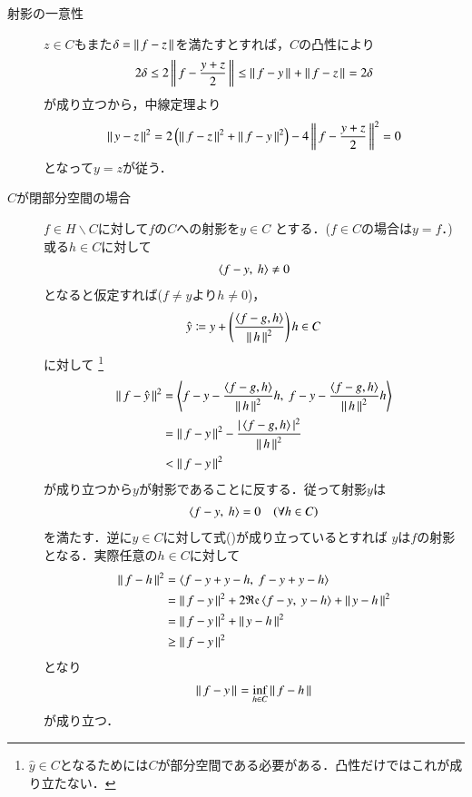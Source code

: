 \begin{prf}
\begin{description}
	\item[射影の一意性]
		$z \in C$もまた$\delta = \left\|\, f - z\, \right\|_{}$を満たすとすれば，$C$の凸性により
		\begin{align}
			2 \delta \leq 2\left\|\, f - \frac{y + z}{2}\, \right\|_{} \leq \left\|\, f - y\, \right\|_{} + \left\|\, f - z\, \right\|_{} = 2\delta
		\end{align}
		が成り立つから，中線定理より
		\begin{align}
			\left\|\, y - z\, \right\|_{}^2 = 2\left( \left\|\, f - z\, \right\|_{}^2 + \left\|\, f - y\, \right\|_{}^2 \right) - 4\left\|\, f - \frac{y + z}{2}\, \right\|_{}^2 = 0
		\end{align}
		となって$y = z$が従う．
	
	\item[$C$が閉部分空間の場合]
		$f \in H \backslash C$に対して$f$の$C$への射影を$y \in C$
		とする．($f \in C$の場合は$y = f$．)或る$h \in C$に対して
		\begin{align}
			\inprod<f -y,\ h> \neq 0
		\end{align}
		となると仮定すれば($f \neq y$より$h \neq 0$)，
		\begin{align}
			\hat{y} \coloneqq y + \left( \frac{\inprod<f - g,h>}{\Norm{h}{}^2} \right)h \in C
		\end{align}
		に対して
		\footnote{
			$\hat{y} \in C$となるためには$C$が部分空間である必要がある．凸性だけではこれが成り立たない．
		}
		\begin{align}
			\Norm{f - \hat{y}}{}^2 
			&= \inprod<f - y - \frac{\inprod<f - g,h>}{\Norm{h}{}^2}h,\ f - y - \frac{\inprod<f - g,h>}{\Norm{h}{}^2}h> \\
			&= \Norm{f-y}{}^2 - \frac{|\inprod<f - g,h>|^2}{\Norm{h}{}^2} \\
			&< \Norm{f-y}{}^2
		\end{align}
		が成り立つから$y$が射影であることに反する．従って射影$y$は
		\begin{align}
			\inprod<f -y,\ h> = 0 \quad (\forall h \in C) \label{eq:projection}
		\end{align}
		を満たす．逆に$y \in C$に対して式()が成り立っているとすれば
		$y$は$f$の射影となる．実際任意の$h \in C$に対して
		\begin{align}
			\Norm{f - h}{}^2 &= \inprod<f - y + y - h,\ f - y + y - h> \\
			&= \Norm{f - y}{}^2 + 2 \Re{\inprod<f - y,\ y - h>} + \Norm{y - h}{}^2 \\
			&= \Norm{f - y}{}^2 + \Norm{y - h}{}^2 \\
			&\geq \Norm{f - y}{}^2
		\end{align}
		となり
		\begin{align}
			\left\|\, f - y\, \right\|_{} = \operatorname*{inf}_{h \in C} \left\|\, f - h\, \right\|_{}
		\end{align}
		が成り立つ．
		\QED
	\end{description}
\end{prf}


